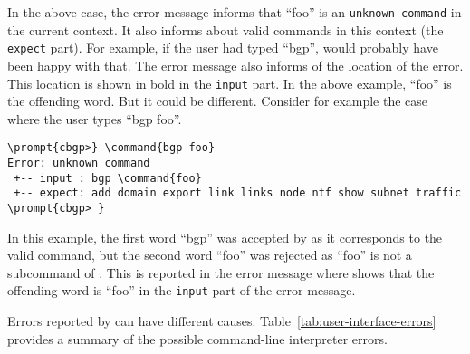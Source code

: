 In the above case, the error message informs that ``foo'' is an
\texttt{unknown command} in the current context. It also informs about
valid commands in this context (the \texttt{expect} part). For
example, if the user had typed ``bgp'',  would
probably have been happy with that. The error message also informs of
the location of the error. This location is shown in bold in the
\texttt{input} part. In the above example, ``foo'' is the 
offending word. But it could be different. Consider for example the
case where the user types ``bgp foo''.

\begin{Verbatim}[commandchars=\\\{\}]
\prompt{cbgp>} \command{bgp foo}
Error: unknown command
 +-- input : bgp \command{foo}
 +-- expect: add domain export link links node ntf show subnet traffic
\prompt{cbgp> }
\end{Verbatim}

In this example, the first word ``bgp'' was accepted by
 as it corresponds to the valid 
command, but the second word ``foo'' was rejected as ``foo'' is not a
subcommand of . This is reported in the error message
where  shows that the offending word is ``foo'' in
the \texttt{input} part of the error message.

Errors reported by  can have different
causes. Table~\ref{tab:user-interface-errors} provides a summary of
the possible command-line interpreter errors.

